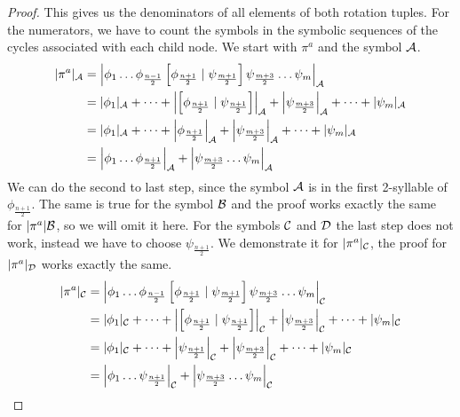 \begin{proof}
	This gives us the denominators of all elements of both rotation tuples.
	For the numerators, we have to count the symbols in the symbolic sequences of the cycles associated with each child node.
	We start with $\pi^a$ and the symbol $\mathcal{A}$.
	\begin{align*}
		|\pi^a|_{\mathcal{A}} & = \left|\phi_1 \dots \phi_{\frac{n-1}{2}} \left[\phi_{\frac{n+1}{2}} \mid \psi_{\frac{m+1}{2}}\right] \psi_{\frac{m+3}{2}} \dots \psi_m\right|_{\mathcal{A}}                \\
		           & = |\phi_1|_{\mathcal{A}} + \dots + \left|\left[\phi_{\frac{n+1}{2}} \mid \psi_{\frac{n+1}{2}}\right]\right|_{\mathcal{A}} + \left|\psi_{\frac{m+3}{2}}\right|_{\mathcal{A}} + \dots + |\psi_m|_{\mathcal{A}} \\
		           & = |\phi_1|_{\mathcal{A}} + \dots + \left|\phi_{\frac{n+1}{2}}\right|_{\mathcal{A}} + \left|\psi_{\frac{m+3}{2}}\right|_{\mathcal{A}} + \dots + |\psi_m|_{\mathcal{A}}                                        \\
		           & = \left|\phi_1 \dots \phi_{\frac{n+1}{2}}\right|_{\mathcal{A}} + \left|\psi_{\frac{m+3}{2}} \dots \psi_m\right|_{\mathcal{A}}
	\end{align*}
	We can do the second to last step, since the symbol $\mathcal{A}$ is in the first 2-syllable of $\phi_{\frac{n+1}{2}}$.
	The same is true for the symbol $\mathcal{B}$ and the proof works exactly the same for $|\pi^a|\mathcal{B}$, so we will omit it here.
	For the symbols $\mathcal{C}$ and $\mathcal{D}$ the last step does not work, instead we have to choose $\psi_{\frac{n+1}{2}}$.
	We demonstrate it for $|\pi^a|_{\mathcal{C}}$, the proof for $|\pi^a|_{\mathcal{D}}$ works exactly the same.
	\begin{align*}
		|\pi^a|_{\mathcal{C}} & = \left|\phi_1 \dots \phi_{\frac{n-1}{2}} \left[\phi_{\frac{n+1}{2}} \mid \psi_{\frac{m+1}{2}}\right] \psi_{\frac{m+3}{2}} \dots \psi_m\right|_{\mathcal{C}}                \\
		           & = |\phi_1|_{\mathcal{C}} + \dots + \left|\left[\phi_{\frac{n+1}{2}} \mid \psi_{\frac{n+1}{2}}\right]\right|_{\mathcal{C}} + \left|\psi_{\frac{m+3}{2}}\right|_{\mathcal{C}} + \dots + |\psi_m|_{\mathcal{C}} \\
		           & = |\phi_1|_{\mathcal{C}} + \dots + \left|\psi_{\frac{n+1}{2}}\right|_{\mathcal{C}} + \left|\psi_{\frac{m+3}{2}}\right|_{\mathcal{C}} + \dots + |\psi_m|_{\mathcal{C}}                                        \\
		           & = \left|\phi_1 \dots \psi_{\frac{n+1}{2}}\right|_{\mathcal{C}} + \left|\psi_{\frac{m+3}{2}} \dots \psi_m\right|_{\mathcal{C}}
	\end{align*}


\end{proof}
